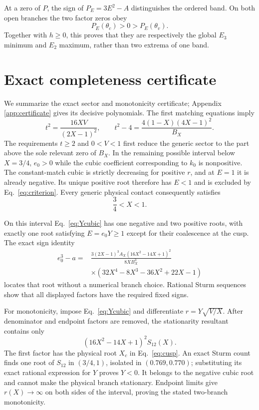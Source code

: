 \documentclass[aps,prb,preprint,superscriptaddress,nofootinbib]{revtex4-2}
\begin{document}
At a zero of $P$, the sign of $P_E=3E^2-A$ distinguishes the ordered band.
On both open branches the two factor zeros obey
\begin{equation}
P_E(\theta_c)>0>P_E(\theta_v).
\label{eq:PEsigns}
\end{equation}
Together with $h\geq0$, this proves that they are respectively the global
$E_3$ minimum and $E_2$ maximum, rather than two extrema of one band.

\section{Exact completeness certificate}
\label{sec:certificate}

We summarize the exact sector and monotonicity certificate; Appendix
\ref{app:certificate} gives its decisive polynomials.  The first matching
equations imply
\begin{equation}
t^2=\frac{16XV}{(2X-1)^2},\qquad
t^2-4=\frac{4(1-X)(4X-1)^2}{B_X}.
\label{eq:tsector}
\end{equation}
The requirements $t\geq2$ and $0<V<1$ first reduce the generic sector to the
part above the sole relevant zero of $B_X$.  In the remaining possible
interval below $X=3/4$, $e_0>0$ while the cubic coefficient corresponding to
$k_0$ is nonpositive.  The constant-match cubic is strictly decreasing for
positive $r$, and at $E=1$ it is already negative.  Its unique positive root
therefore has $E<1$ and is excluded by Eq.~\eqref{eq:criterion}.  Every
generic physical contact consequently satisfies
\begin{equation}
\frac34<X<1.
\label{eq:Xsector}
\end{equation}

On this interval Eq.~\eqref{eq:Ycubic} has one negative and two positive
roots, with exactly one root satisfying $E=e_0Y\geq1$ except for their
coalescence at the cusp.  The exact sign identity
\begin{align}
e_0^3-a={}&\frac{3(2X-1)^3A_X(16X^2-14X+1)^2}{8XB_X^3}\nonumber\\
&\times(32X^4-8X^3-36X^2+22X-1)
\end{align}
locates that root without a numerical branch choice.  Rational Sturm
sequences show that all displayed factors have the required fixed signs.

For monotonicity, impose Eq.~\eqref{eq:Ycubic} and differentiate
$r=Y\sqrt{V/X}$.  After denominator and endpoint factors are removed, the
stationarity resultant contains only
\begin{equation}
(16X^2-14X+1)^2S_{12}(X).
\label{eq:stationaryfactors}
\end{equation}
The first factor has the physical root $X_c$ in Eq.~\eqref{eq:cusp}.  An
exact Sturm count finds one root of $S_{12}$ in $(3/4,1)$, isolated in
$(0.769,0.770)$; substituting its exact rational expression for $Y$ proves
$Y<0$.  It belongs to the negative cubic root and cannot make the physical
branch stationary.  Endpoint limits give $r(X)\to\infty$ on both sides of
the interval, proving the stated two-branch monotonicity.
\end{document}
